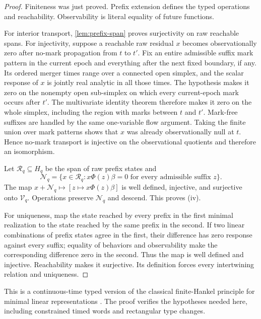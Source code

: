 \documentclass[11pt]{article}
\newcommand{\cR}{\mathcal R}
\newcommand{\cV}{\mathcal V}
\newcommand{\cN}{\mathcal N}
\begin{document}
\begin{proof}
Finiteness was just proved.  Prefix extension defines the typed operations and reachability.  Observability is literal equality of future functions.

For interior transport, \cref{lem:prefix-span} proves surjectivity on raw reachable spans.  For injectivity, suppose a reachable raw residual $x$ becomes observationally zero after no-mark propagation from $t$ to $t'$.  Fix an entire admissible suffix mark pattern in the current epoch and everything after the next fixed boundary, if any.  Its ordered merger times range over a connected open simplex, and the scalar response of $x$ is jointly real analytic in all those times.  The hypothesis makes it zero on the nonempty open sub-simplex on which every current-epoch mark occurs after $t'$.  The multivariate identity theorem therefore makes it zero on the whole simplex, including the region with marks between $t$ and $t'$.  Mark-free suffixes are handled by the same one-variable flow argument.  Taking the finite union over mark patterns shows that $x$ was already observationally null at $t$.  Hence no-mark transport is injective on the observational quotients and therefore an isomorphism.

Let $\cR_q\subseteq H_q$ be the span of raw prefix states and
\[
\cN_q=\{x\in\cR_q:x\Phi(z)\beta=0\text{ for every admissible suffix }z\}.
\]
The map $x+\cN_q\mapsto[z\mapsto x\Phi(z)\beta]$ is well defined, injective, and surjective onto $\cV_q$.  Operations preserve $\cN_q$ and descend.  This proves (iv).

For uniqueness, map the state reached by every prefix in the first minimal realization to the state reached by the same prefix in the second.  If two linear combinations of prefix states agree in the first, their difference has zero response against every suffix; equality of behaviors and observability make the corresponding difference zero in the second.  Thus the map is well defined and injective.  Reachability makes it surjective.  Its definition forces every intertwining relation and uniqueness.
\end{proof}

This is a continuous-time typed version of the classical finite-Hankel principle for minimal linear representations \citep{Fliess1974,BerstelReutenauer2011}.  The proof verifies the hypotheses needed here, including constrained timed words and rectangular type changes.
\end{document}
